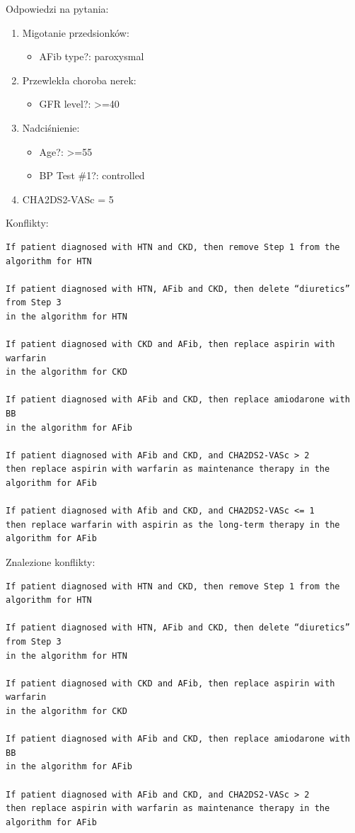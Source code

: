 \newpage
\noindent Odpowiedzi na pytania:
\begin{enumerate}
\item{Migotanie przedsionków:
	\begin{itemize}
	\item{AFib type?: paroxysmal}
	\end{itemize}
}
\item{Przewlekła choroba nerek:
	\begin{itemize}
	\item{GFR level?: >=40}
	\end{itemize}
}
\item{Nadciśnienie:
	\begin{itemize}
	\item{Age?: >=55}
	\item{BP Test \#1?: controlled}
	\end{itemize}
}

\item{CHA2DS2-VASc = 5}
\end{enumerate}
Konflikty:
\begin{verbatim}
If patient diagnosed with HTN and CKD, then remove Step 1 from the algorithm for HTN

If patient diagnosed with HTN, AFib and CKD, then delete “diuretics” from Step 3 
in the algorithm for HTN

If patient diagnosed with CKD and AFib, then replace aspirin with warfarin 
in the algorithm for CKD

If patient diagnosed with AFib and CKD, then replace amiodarone with BB 
in the algorithm for AFib

If patient diagnosed with AFib and CKD, and CHA2DS2-VASc > 2
then replace aspirin with warfarin as maintenance therapy in the algorithm for AFib

If patient diagnosed with Afib and CKD, and CHA2DS2-VASc <= 1
then replace warfarin with aspirin as the long-term therapy in the algorithm for AFib
\end{verbatim}
Znalezione konflikty:
\begin{verbatim}
If patient diagnosed with HTN and CKD, then remove Step 1 from the algorithm for HTN

If patient diagnosed with HTN, AFib and CKD, then delete “diuretics” from Step 3
in the algorithm for HTN

If patient diagnosed with CKD and AFib, then replace aspirin with warfarin 
in the algorithm for CKD

If patient diagnosed with AFib and CKD, then replace amiodarone with BB 
in the algorithm for AFib

If patient diagnosed with AFib and CKD, and CHA2DS2-VASc > 2
then replace aspirin with warfarin as maintenance therapy in the algorithm for AFib
\end{verbatim}
\newpage
